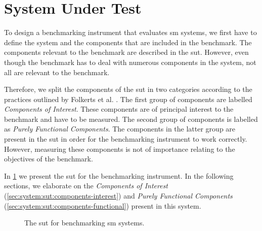 \section{System Under Test}
\label{sec:system:sut}

To design a benchmarking instrument that evaluates \gls{sm} systems, we first have to define the system and the components that are included in the benchmark. The components relevant to the benchmark are described in the \gls{sut}. However, even though the benchmark has to deal with numerous components in the system, not all are relevant to the benchmark.

Therefore, we split the components of the \gls{sut} in two categories according to the practices outlined by Folkerts et al. \cite{folkerts2012benchmarking}. The first group of components are labelled \textit{Components of Interest}. These components are of principal interest to the benchmark and have to be measured. The second group of components is labelled as \textit{Purely Functional Components}. The components in the latter group are present in the \gls{sut} in order for the benchmarking instrument to work correctly. However, measuring these components is not of importance relating to the objectives of the benchmark.

In \cref{fig:sut} we present the \gls{sut} for the benchmarking instrument. In the following sections, we elaborate on the  \textit{Components of Interest} (\cref{sec:system:sut:components-interest}) and \textit{Purely Functional Components} (\cref{sec:system:sut:components-functional})  present in this system.

\begin{figure}[!t]
    \centering
    
    
    \caption{The \gls{sut} for benchmarking \gls{sm} systems.}
    
    \label{fig:sut}
\end{figure}

